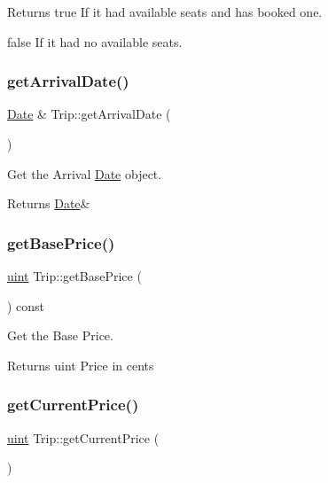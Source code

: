 \begin{DoxyReturn}{Returns}
true If it had available seats and has booked one. 

false If it had no available seats. 
\end{DoxyReturn}
\mbox{\label{classTrip_a821dfd23e37c28f1c0a2dab3f2836799}} 
\subsubsection{\texorpdfstring{get\+Arrival\+Date()}{getArrivalDate()}}
{\footnotesize\ttfamily \mbox{\hyperlink{classDate}{Date}} \& Trip\+::get\+Arrival\+Date (\begin{DoxyParamCaption}{ }\end{DoxyParamCaption})}



Get the Arrival \mbox{\hyperlink{classDate}{Date}} object. 

\begin{DoxyReturn}{Returns}
\mbox{\hyperlink{classDate}{Date}}\& 
\end{DoxyReturn}
\mbox{\label{classTrip_af2a3a9f9e33b9dd31e9193cf48bec134}} 
\subsubsection{\texorpdfstring{get\+Base\+Price()}{getBasePrice()}}
{\footnotesize\ttfamily \mbox{\hyperlink{project__utils_8h_a91ad9478d81a7aaf2593e8d9c3d06a14}{uint}} Trip\+::get\+Base\+Price (\begin{DoxyParamCaption}{ }\end{DoxyParamCaption}) const}



Get the Base Price. 

\begin{DoxyReturn}{Returns}
uint Price in cents 
\end{DoxyReturn}
\mbox{\label{classTrip_a9006732aa32a2b098538d48b63f2d276}} 
\subsubsection{\texorpdfstring{get\+Current\+Price()}{getCurrentPrice()}}
{\footnotesize\ttfamily \mbox{\hyperlink{project__utils_8h_a91ad9478d81a7aaf2593e8d9c3d06a14}{uint}} Trip\+::get\+Current\+Price (\begin{DoxyParamCaption}{ }\end{DoxyParamCaption})}



